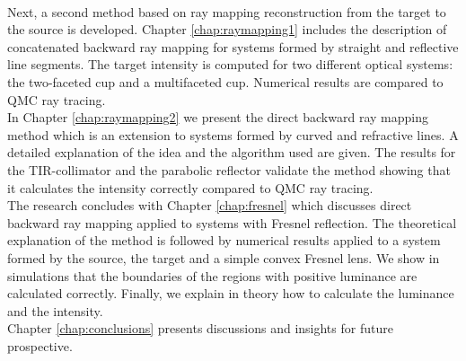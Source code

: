 \\ \indent Next, a second method based on ray mapping reconstruction from the target to the source is developed. Chapter \ref{chap:raymapping1} includes the description of concatenated backward ray mapping for systems formed by straight and reflective line segments. The target intensity is computed for two different optical systems: the two-faceted cup and a multifaceted cup. Numerical results are compared to QMC ray tracing. \\ \indent 
In Chapter \ref{chap:raymapping2} we present the direct backward ray mapping method which is an extension to systems formed by curved and refractive lines. A detailed explanation of the idea and the algorithm used are given. The results for the TIR-collimator and the parabolic reflector validate the method showing that it calculates the intensity correctly compared to QMC ray tracing. \\ \indent
The research concludes with Chapter \ref{chap:fresnel} which discusses direct backward ray mapping applied to systems with Fresnel reflection. The theoretical explanation of the method is followed by numerical results applied to a system formed by the source, the target and a simple convex Fresnel lens. We show in simulations that the boundaries of the regions with positive luminance are calculated correctly. Finally, we explain in theory how to calculate the luminance and the intensity. \\ \indent Chapter \ref{chap:conclusions} presents discussions and insights for future prospective.
\clearpage{\pagestyle{empty}\cleardoublepage}
 